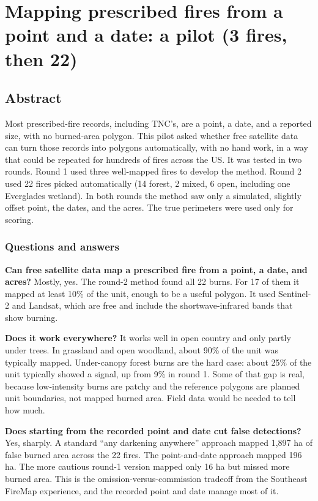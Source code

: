 \documentclass[
]{article}
\author{}
\date{\vspace{-2.5em}}
\begin{document}
\section{Mapping prescribed fires from a point and a date: a pilot (3
fires, then
22)}\label{mapping-prescribed-fires-from-a-point-and-a-date-a-pilot-3-fires-then-22}

\subsection{Abstract}\label{abstract}

Most prescribed-fire records, including TNC's, are a point, a date, and
a reported size, with no burned-area polygon. This pilot asked whether
free satellite data can turn those records into polygons automatically,
with no hand work, in a way that could be repeated for hundreds of fires
across the US. It was tested in two rounds. Round 1 used three
well-mapped fires to develop the method. Round 2 used 22 fires picked
automatically (14 forest, 2 mixed, 6 open, including one Everglades
wetland). In both rounds the method saw only a simulated, slightly
offset point, the dates, and the acres. The true perimeters were used
only for scoring.

\subsubsection{Questions and answers}\label{questions-and-answers}

\textbf{Can free satellite data map a prescribed fire from a point, a
date, and acres?} Mostly, yes. The round-2 method found all 22 burns.
For 17 of them it mapped at least 10\% of the unit, enough to be a
useful polygon. It used Sentinel-2 and Landsat, which are free and
include the shortwave-infrared bands that show burning.

\textbf{Does it work everywhere?} It works well in open country and only
partly under trees. In grassland and open woodland, about 90\% of the
unit was typically mapped. Under-canopy forest burns are the hard case:
about 25\% of the unit typically showed a signal, up from 9\% in round
1. Some of that gap is real, because low-intensity burns are patchy and
the reference polygons are planned unit boundaries, not mapped burned
area. Field data would be needed to tell how much.

\textbf{Does starting from the recorded point and date cut false
detections?} Yes, sharply. A standard ``any darkening anywhere''
approach mapped 1,897 ha of false burned area across the 22 fires. The
point-and-date approach mapped 196 ha. The more cautious round-1 version
mapped only 16 ha but missed more burned area. This is the
omission-versus-commission tradeoff from the Southeast FireMap
experience, and the recorded point and date manage most of it.
\end{document}
